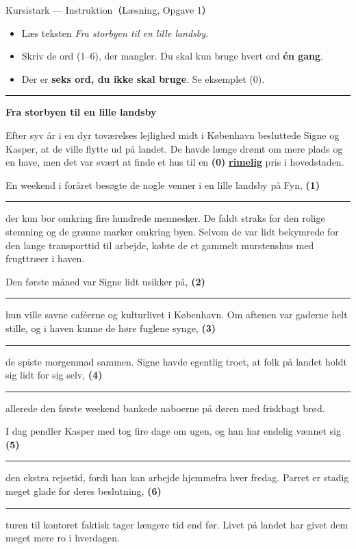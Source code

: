\begin{emailbox}{Kursistark --- Instruktion（Læsning, Opgave 1）}
\begin{itemize}
  \item Læs teksten \textit{Fra storbyen til en lille landsby}.
  \item Skriv de ord (1--6), der mangler. Du skal kun bruge hvert ord \textbf{én gang}.
  \item Der er \textbf{seks ord, du ikke skal bruge}. Se eksemplet (0).
\end{itemize}

\vspace{0.35em}
\hrule
\vspace{0.45em}

\textbf{\color{NCDNavy}Fra storbyen til en lille landsby}

\vspace{0.3em}
Efter syv år i en dyr toværelses lejlighed midt i København besluttede Signe og Kasper, at de ville flytte ud på landet. De havde længe drømt om mere plads og en have, men det var svært at finde et hus til en \textbf{(0)} \underline{\textbf{rimelig}} pris i hovedstaden.

\vspace{0.35em}
En weekend i foråret besøgte de nogle venner i en lille landsby på Fyn, \textbf{(1)} \rule{2.0cm}{0.4pt} der kun bor omkring fire hundrede mennesker. De faldt straks for den rolige stemning og de grønne marker omkring byen. Selvom de var lidt bekymrede for den lange transporttid til arbejde, købte de et gammelt murstenshus med frugttræer i haven.

\vspace{0.35em}
Den første måned var Signe lidt usikker på, \textbf{(2)} \rule{2.0cm}{0.4pt} hun ville savne caféerne og kulturlivet i København. Om aftenen var gaderne helt stille, og i haven kunne de høre fuglene synge, \textbf{(3)} \rule{2.0cm}{0.4pt} de spiste morgenmad sammen. Signe havde egentlig troet, at folk på landet holdt sig lidt for sig selv, \textbf{(4)} \rule{2.0cm}{0.4pt} allerede den første weekend bankede naboerne på døren med friskbagt brød.

\vspace{0.35em}
I dag pendler Kasper med tog fire dage om ugen, og han har endelig vænnet sig \textbf{(5)} \rule{2.0cm}{0.4pt} den ekstra rejsetid, fordi han kan arbejde hjemmefra hver fredag. Parret er stadig meget glade for deres beslutning, \textbf{(6)} \rule{2.0cm}{0.4pt} turen til kontoret faktisk tager længere tid end før. Livet på landet har givet dem meget mere ro i hverdagen.


\end{emailbox}

